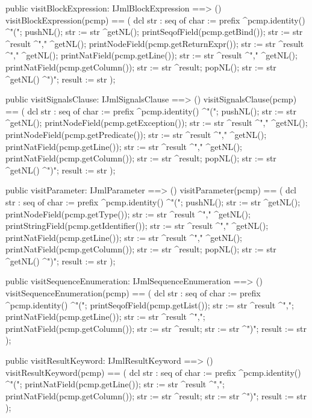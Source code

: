 \begin{vdm_al}
  public visitBlockExpression: IJmlBlockExpression ==> ()
  visitBlockExpression(pcmp) ==
    ( dcl str : seq of char := prefix ^pcmp.identity() ^"(";
      pushNL();
      str := str ^getNL();
      printSeqofField(pcmp.getBind());
      str := str ^result ^"," ^getNL();
      printNodeField(pcmp.getReturnExpr());
      str := str ^result ^"," ^getNL();
      printNatField(pcmp.getLine());
      str := str ^result ^"," ^getNL();
      printNatField(pcmp.getColumn());
      str := str ^result;
      popNL();
      str := str ^getNL() ^")";
      result := str );

  public visitSignalsClause: IJmlSignalsClause ==> ()
  visitSignalsClause(pcmp) ==
    ( dcl str : seq of char := prefix ^pcmp.identity() ^"(";
      pushNL();
      str := str ^getNL();
      printNodeField(pcmp.getException());
      str := str ^result ^"," ^getNL();
      printNodeField(pcmp.getPredicate());
      str := str ^result ^"," ^getNL();
      printNatField(pcmp.getLine());
      str := str ^result ^"," ^getNL();
      printNatField(pcmp.getColumn());
      str := str ^result;
      popNL();
      str := str ^getNL() ^")";
      result := str );

  public visitParameter: IJmlParameter ==> ()
  visitParameter(pcmp) ==
    ( dcl str : seq of char := prefix ^pcmp.identity() ^"(";
      pushNL();
      str := str ^getNL();
      printNodeField(pcmp.getType());
      str := str ^result ^"," ^getNL();
      printStringField(pcmp.getIdentifier());
      str := str ^result ^"," ^getNL();
      printNatField(pcmp.getLine());
      str := str ^result ^"," ^getNL();
      printNatField(pcmp.getColumn());
      str := str ^result;
      popNL();
      str := str ^getNL() ^")";
      result := str );

  public visitSequenceEnumeration: IJmlSequenceEnumeration ==> ()
  visitSequenceEnumeration(pcmp) ==
    ( dcl str : seq of char := prefix ^pcmp.identity() ^"(";
      printSeqofField(pcmp.getList());
      str := str ^result ^",";
      printNatField(pcmp.getLine());
      str := str ^result ^",";
      printNatField(pcmp.getColumn());
      str := str ^result;
      str := str ^")";
      result := str );

  public visitResultKeyword: IJmlResultKeyword ==> ()
  visitResultKeyword(pcmp) ==
    ( dcl str : seq of char := prefix ^pcmp.identity() ^"(";
      printNatField(pcmp.getLine());
      str := str ^result ^",";
      printNatField(pcmp.getColumn());
      str := str ^result;
      str := str ^")";
      result := str );


\end{vdm_al}
